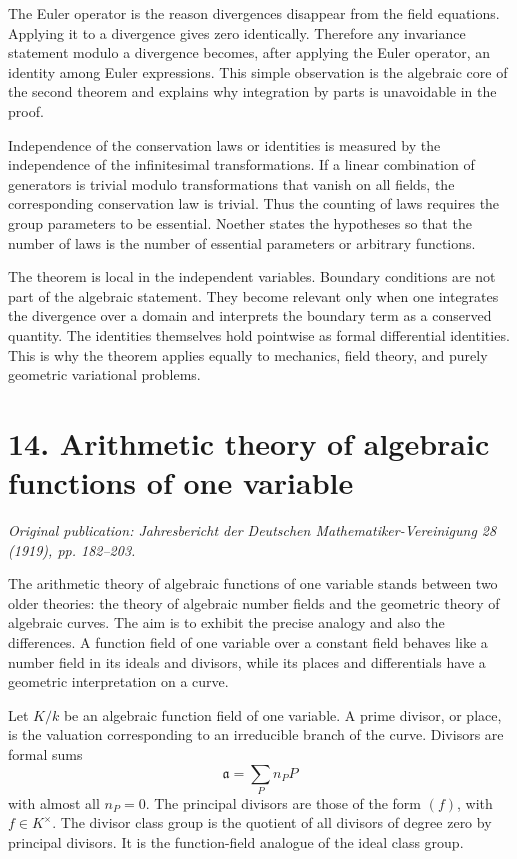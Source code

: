 \documentclass[11pt]{article}
\begin{document}
The Euler operator is the reason divergences disappear from the field equations. Applying it to a
divergence gives zero identically. Therefore any invariance statement modulo a divergence becomes,
after applying the Euler operator, an identity among Euler expressions. This simple observation is
the algebraic core of the second theorem and explains why integration by parts is unavoidable in the
proof.

Independence of the conservation laws or identities is measured by the independence of the
infinitesimal transformations. If a linear combination of generators is trivial modulo
transformations that vanish on all fields, the corresponding conservation law is trivial. Thus the
counting of laws requires the group parameters to be essential. Noether states the hypotheses so
that the number of laws is the number of essential parameters or arbitrary functions.

The theorem is local in the independent variables. Boundary conditions are not part of the algebraic
statement. They become relevant only when one integrates the divergence over a domain and interprets
the boundary term as a conserved quantity. The identities themselves hold pointwise as formal
differential identities. This is why the theorem applies equally to mechanics, field theory, and
purely geometric variational problems.


\section{14. Arithmetic theory of algebraic functions of one variable}

\textit{Original publication: Jahresbericht der Deutschen Mathematiker-Vereinigung 28 (1919), pp. 182--203.}

The arithmetic theory of algebraic functions of one variable stands between two older theories: the
theory of algebraic number fields and the geometric theory of algebraic curves. The aim is to
exhibit the precise analogy and also the differences. A function field of one variable over a
constant field behaves like a number field in its ideals and divisors, while its places and
differentials have a geometric interpretation on a curve.


Let \(K/k\) be an algebraic function field of one variable. A prime divisor, or place, is the
valuation corresponding to an irreducible branch of the curve. Divisors are formal sums \[
\mathfrak a=\sum_P n_P P \] with almost all \(n_P=0\). The principal divisors are those of the form
\((f)\), with \(f\in K^\times\). The divisor class group is the quotient of all divisors of degree
zero by principal divisors. It is the function-field analogue of the ideal class group.
\end{document}
